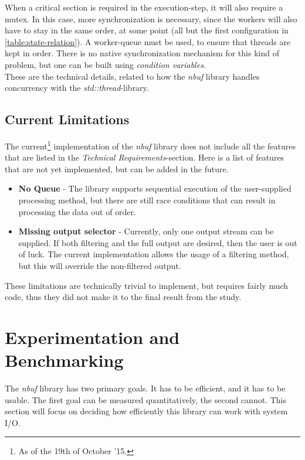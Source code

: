 \documentclass[a4paper]{article}
\newcommand{\nbuf}{\textit{nbuf} }
\begin{document}
When a critical section is required in the execution-step, it will also require a mutex. In this case, more synchronization is necessary, since the workers will also have to stay in the same order, at some point (all but the first configuration in \autoref{table:state-relation}). A worker-queue must be used, to ensure that threads are kept in order. There is no native synchronization mechanism for this kind of problem, but one can be built using \textit{condition variables}.\\

These are the technical details, related to how the \nbuf library handles concurrency with the \textit{std::thread}-library.


\subsection{Current Limitations}
The current\footnote{As of the 19th of October '15.} implementation of the \nbuf library does not include all the features that are listed in the \textit{Technical Requirements}-section. Here is a list of features that are not yet implemented, but can be added in the future.

\begin{itemize}
\item \textbf{No Queue} - The library supports sequential execution of the user-supplied processing method, but there are still race conditions that can result in processing the data out of order.
\item \textbf{Missing output selector} - Currently, only one output stream can be supplied. If both filtering and the full output are desired, then the user is out of luck. The current implementation allows the usage of a filtering method, but this will override the non-filtered output. 
\end{itemize}

These limitations are technically trivial to implement, but requires fairly much code, thus they did not make it to the final result from the study.


\newpage
\section{Experimentation and Benchmarking}
The \nbuf library has two primary goals. It has to be efficient, and it has to be usable. The first goal can be measured quantitatively, the second cannot. This section will focus on deciding how efficiently this library can work with system I/O. 
\end{document}
